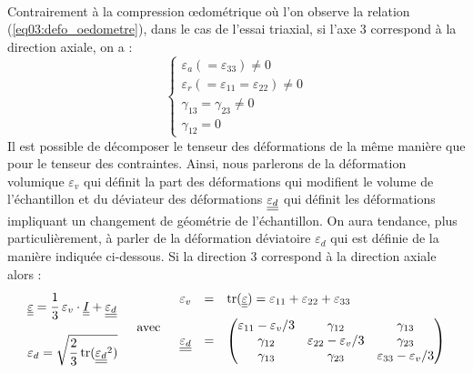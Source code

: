 				\\Contrairement à la compression \oe{}dométrique où l'on observe la relation (\ref{eq03:defo_oedometre}), dans le cas de l'essai triaxial, si l'axe $3$ correspond à la direction axiale, on a :
				\begin{equation}\label{eq03:defo_triax}
					\left\{\begin{array}{l}
						\varepsilon_a (=\varepsilon_{33}) \neq 0\\
						\varepsilon_r (=\varepsilon_{11} =\varepsilon_{22}) \neq 0\\
						\gamma_{13} = \gamma_{23} \neq 0\\
						\gamma_{12} = 0
					\end{array}\right.
				\end{equation}
				Il est possible de décomposer le tenseur des déformations de la même manière que pour le tenseur des contraintes. Ainsi, nous parlerons de la déformation volumique $\varepsilon_v$ qui définit la part des déformations qui modifient le volume de l'échantillon et du déviateur des déformations $\underline{\underline{\varepsilon_d}}$ qui définit les déformations impliquant un changement de géométrie de l'échantillon. On aura tendance, plus particulièrement, à parler de la déformation déviatoire $\varepsilon_d$ qui est définie de la manière indiquée ci-dessous. Si la direction \num{3} correspond à la direction axiale alors :
				\begin{equation}\label{eq03:decomposition_defo_triax}
					\begin{array}{l}
						\doubleunderline{\varepsilon} = \cfrac{1}{3}\;\varepsilon_v\cdot\doubleunderline{I} + \doubleunderline{\varepsilon_d}\\\\
						\varepsilon_d = \sqrt{\cfrac{2}{3}\;\mathrm{tr}(\doubleunderline{\varepsilon_d}^2)}
					\end{array}
					\quad\text{avec}\quad\begin{array}{rcl}
					\varepsilon_v & = & \text{tr}(\doubleunderline{\varepsilon})\vspace{0.3cm} = \varepsilon_{11}+\varepsilon_{22}+\varepsilon_{33}\\
					\doubleunderline{\varepsilon_d} & = &
					\begin{pmatrix}
					\varepsilon_{11}-\varepsilon_v/3 & \gamma_{12} & \gamma_{13} \\
					\gamma_{12} & \varepsilon_{22}-\varepsilon_v/3 & \gamma_{23} \\
					\gamma_{13} & \gamma_{23} & \varepsilon_{33}-\varepsilon_v/3 \\
					\end{pmatrix}\end{array}
				\end{equation}
